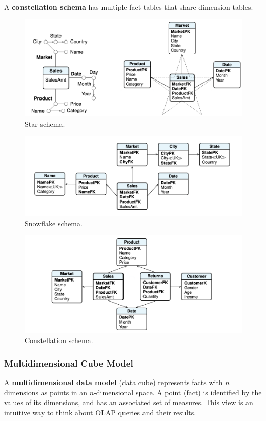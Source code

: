 A \textbf{constellation schema} has multiple fact tables that share dimension tables.
\begin{figure}[ht]
    \centering
    \includegraphics[width=0.65\linewidth]{img/star_schema.png}
    \caption{Star schema.}
    \label{fig:star-schema}
\end{figure} 
\begin{figure}[ht]
    \centering
    \includegraphics[width=0.65\linewidth]{img/snowflake_schema.png}
    \caption{Snowflake schema.}
    \label{fig:snowflake-schema}
\end{figure}
\begin{figure}[ht]
    \centering
    \includegraphics[width=0.65\linewidth]{img/constellation_schema.png}
    \caption{Constellation schema.}
    \label{fig:constellation-schema}
\end{figure}

\subsubsection{Multidimensional Cube Model}

A \textbf{multidimensional data model} (data cube) represents facts with $n$ dimensions as points in an $n$-dimensional space. A point (fact) is identified by the values of its dimensions, and has an associated set of measures. This view is an intuitive way to think about OLAP queries and their results.

